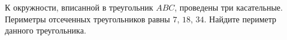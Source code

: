 \begin{ex}
	\begin{condition}
		К окружности, вписанной в треугольник \( ABC \), проведены три касательные. Периметры отсеченных треугольников равны \( 7 \), \( 18 \), \( 34 \). Найдите периметр данного треугольника.
	\end{condition}
\end{ex}